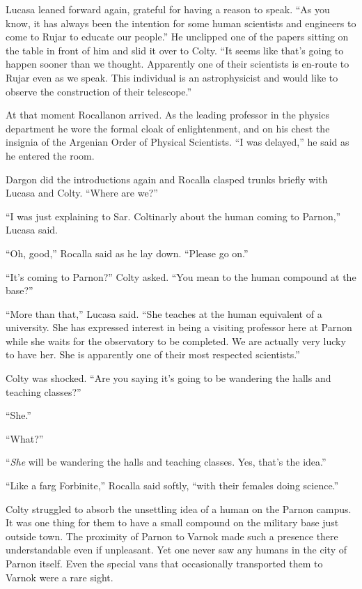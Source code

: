 Lucasa leaned forward again, grateful for having a reason to speak. ``As you know, it has always
been the intention for some human scientists and engineers to come to Rujar to educate our
people.'' He unclipped one of the papers sitting on the table in front of him and slid it over
to Colty. ``It seems like that's going to happen sooner than we thought. Apparently one of their
scientists is en-route to Rujar even as we speak. This individual is an astrophysicist and would
like to observe the construction of their telescope.''

At that moment Rocallanon arrived. As the leading professor in the physics department he wore
the formal cloak of enlightenment, and on his chest the insignia of the Argenian Order of
Physical Scientists. ``I was delayed,'' he said as he entered the room.

Dargon did the introductions again and Rocalla clasped trunks briefly with Lucasa and Colty.
``Where are we?''

``I was just explaining to Sar. Coltinarly about the human coming to Parnon,'' Lucasa said.

``Oh, good,'' Rocalla said as he lay down. ``Please go on.''

``It's coming to Parnon?'' Colty asked. ``You mean to the human compound at the base?''

``More than that,'' Lucasa said. ``She teaches at the human equivalent of a university. She has
expressed interest in being a visiting professor here at Parnon while she waits for the
observatory to be completed. We are actually very lucky to have her. She is apparently one of
their most respected scientists.''

Colty was shocked. ``Are you saying it's going to be wandering the halls and teaching classes?''

``She.''

``What?''

``\emph{She} will be wandering the halls and teaching classes. Yes, that's the idea.''

``Like a farg Forbinite,'' Rocalla said softly, ``with their females doing science.''

Colty struggled to absorb the unsettling idea of a human on the Parnon campus. It was one thing
for them to have a small compound on the military base just outside town. The proximity of
Parnon to Varnok made such a presence there understandable even if unpleasant. Yet one never saw
any humans in the city of Parnon itself. Even the special vans that occasionally transported
them to Varnok were a rare sight.

